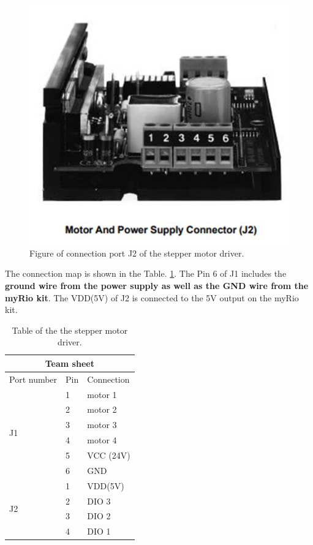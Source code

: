 \documentclass[idxtotoc,hyperref,openany]{labbook} %
\begin{document}
\begin{figure}[h!]
\centering
\includegraphics[scale=0.5]{./Figure/fig_steppermotorj2}
\caption{Figure of connection port J2 of the stepper motor driver.}\label{fig_steppermotorj2}
\end{figure}

The connection map is shown in the Table. \ref{tab_steppermotordriver}. The Pin 6 of J1 includes the \textbf{ground wire from the power supply as well as the GND wire from the myRio kit}. The VDD(5V) of J2 is connected to the 5V output on the myRio kit. 

\begin{table}
\centering
\caption{Table of the the stepper motor driver.}\label{tab_steppermotordriver}
\begin{tabular}{l|l|l}
\hline
\multicolumn{3}{c}{Team sheet}\\
\hline
Port number & Pin & Connection\\\hline
\multirow{6}{*}{J1} & 1 & motor 1\\
& 2 & motor 2\\
& 3 & motor 3  \\
& 4 & motor 4  \\
& 5 & VCC (24V)  \\
& 6 & GND \\\hline
\multirow{4}{*}{J2} & 1 & VDD(5V)\\
& 2 & DIO 3\\
& 3 & DIO 2\\
& 4 & DIO 1\\\hline
\end{tabular}
\end{table}
 
\end{document}
